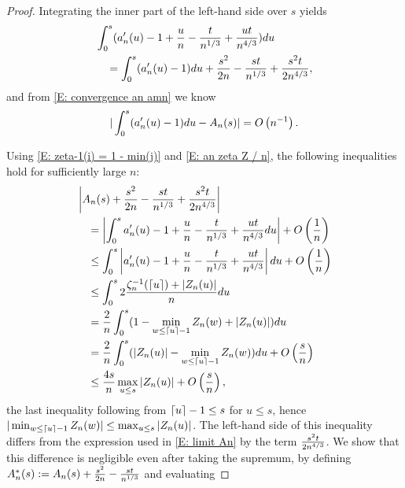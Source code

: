 \begin{proof}
	Integrating the inner part of the left-hand side over $s$ yields
	\begin{equation}
	\begin{aligned}
	&\int_{0}^{s} (a'_n(u) - 1 + \frac{u}{n} - \frac{t}{n^{1 / 3}} + \frac{ut}{n^{4 / 3}}) du \\
	&\quad = \int_{0}^{s}(a'_n(u) - 1) du + \frac{s^2}{2n} - \frac{st}{n^{1 / 3}} + \frac{s^2t}{2n^{4 / 3}},
	\end{aligned}
	\end{equation}
	and from \eqref{E: convergence an amn} we know
	\begin{equation} \label{E: convergence amn An}
	|\int_{0}^{s}(a'_n(u) - 1) du - A_n(s)| = O\left(n^{-1}\right).
	\end{equation}
	
	Using \eqref{E: zeta-1(i) = 1 - min(j)} and \eqref{E: an zeta Z / n}, the following inequalities hold for sufficiently large $n$:
	\begin{equation} \label{E: int an <= 4s/n maxZ + O()}
	\begin{aligned}
	&\left| A_n(s) + \frac{s^2}{2n} - \frac{st}{n^{1 / 3}}  + \frac{s^2t}{2n^{4 / 3}}  \right| \\
	&\quad = \left| \int_{0}^{s} a'_n(u) - 1 + \frac{u}{n} - \frac{t}{n^{1 / 3}} + \frac{ut}{n^{4 / 3}} du \right| + O\left(\frac{1}{n}\right) \\
	&\quad \leq \int_{0}^{s} \left|a'_n(u) - 1 + \frac{u}{n} - \frac{t}{n^{1 / 3}} + \frac{ut}{n^{4 / 3}} \right| du + O\left(\frac{1}{n}\right) \\ 
	&\quad \leq \int_{0}^{s} 2 \frac{\zeta^{-1}_n(\lceil u\rceil) + |Z_n(u)|}{n} du \\ 
	&\quad = \frac{2}{n}  \int_{0}^{s} (1-\min_{w \leq \lceil u\rceil-1} Z_n(w)  + |Z_n(u)| )du \\ 
	&\quad = \frac{2}{n}  \int_{0}^{s} (|Z_n(u)| - \min_{w \leq \lceil u\rceil-1} Z_n(w)) du + O\left(\frac{s}{n}\right) \\ 
	&\quad \leq \frac{4s}{n} \max_{u \leq s} |Z_n(u)| + O\left(\frac{s}{n}\right),
	\end{aligned}
	\end{equation}
    the last inequality following from $\lceil u\rceil-1 \leq s$ for $u\leq s$, hence $|\min_{w \leq \lceil u\rceil-1}Z_n(w)| \leq \max_{u \leq s}|Z_n(u)|$.
    The left-hand side of this inequality differs from the expression used in \eqref{E: limit An} by the term $\frac{s^2t}{2n^{4 / 3}}$.
    We show that this difference is negligible even after taking the supremum, by defining $A^*_n(s) := A_n(s) + \frac{s^2}{2n} - \frac{st}{n^{1 / 3}}$
    and evaluating

\end{proof}
